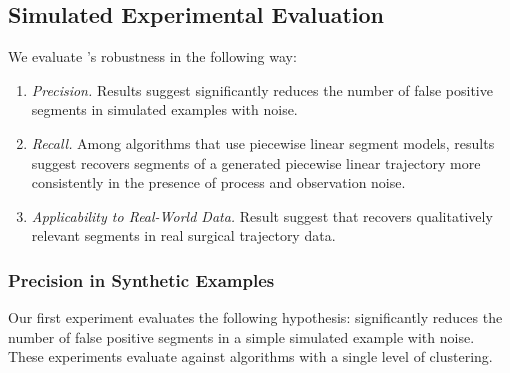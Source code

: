 \subsection{Simulated Experimental Evaluation}
 We evaluate \tsc's robustness in the following way:
\begin{enumerate}
   \item \emph{Precision. } Results suggest \tsc significantly reduces the number of false positive segments in simulated examples with noise.
   \item \emph{Recall. } Among algorithms that use piecewise linear segment models, results suggest \tsc recovers segments of a generated piecewise linear trajectory more consistently in the presence of process and observation noise.
   \item \emph{Applicability to Real-World Data. } Result suggest that \tsc recovers qualitatively relevant segments in real surgical trajectory data.
\end{enumerate}

\subsubsection{Precision in Synthetic Examples}
Our first experiment evaluates the following hypothesis: \tsc significantly reduces the number of false positive segments in a simple simulated example with noise. These experiments evaluate \tsc against algorithms with a single level of clustering.

